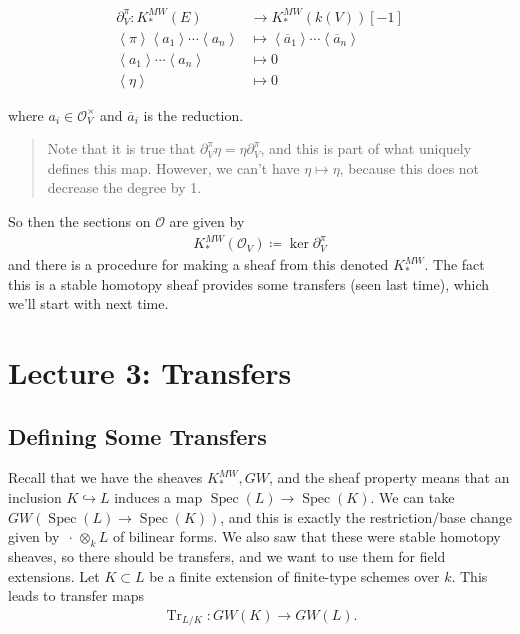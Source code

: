 \begin{align*} {\partial}_V^\pi: K_*^{MW}(E) &\to K_*^{MW}(k(V))[-1] \\ \left\langle{\pi}\right\rangle\left\langle{a_1}\right\rangle\cdots\left\langle{a_n}\right\rangle &\mapsto \left\langle{\overline a_1}\right\rangle \cdots\left\langle{\overline a_n}\right\rangle \\ \left\langle{a_1}\right\rangle \cdots \left\langle{a_n}\right\rangle &\mapsto 0 \\ \left\langle{\eta}\right\rangle &\mapsto 0 \end{align*}

where \(a_i \in \mathcal{O}_V^\times\) and \(\overline a_i\) is the
reduction.

\begin{quote}
Note that it is true that
\({\partial}_V^\pi \eta = \eta {\partial}_V^\pi\), and this is part of
what uniquely defines this map. However, we can't have
\(\eta \mapsto \eta\), because this does not decrease the degree by 1.
\end{quote}

So then the sections on \(\mathcal O\) are given by
\begin{align*}
K^{MW}_*(\mathcal O_V) \coloneqq\ker {\partial}_V^\pi
\end{align*}
and there is a procedure for making a sheaf from this denoted
\(K_*^{MW}\). The fact this is a stable homotopy sheaf provides some
transfers (seen last time), which we'll start with next time.

\hypertarget{lecture-3-transfers}{%
\section{Lecture 3: Transfers}\label{lecture-3-transfers}}

\hypertarget{defining-some-transfers}{%
\subsection{Defining Some Transfers}\label{defining-some-transfers}}

Recall that we have the sheaves \(K^{MW}_*, GW\), and the sheaf property
means that an inclusion \(K \hookrightarrow L\) induces a map
\(\operatorname{Spec}(L) \to \operatorname{Spec}(K)\). We can take
\(GW(\operatorname{Spec}(L) \to \operatorname{Spec}(K))\), and this is
exactly the restriction/base change given by \({\,\cdot\,}\otimes_k L\)
of bilinear forms. We also saw that these were stable homotopy sheaves,
so there should be transfers, and we want to use them for field
extensions. Let \(K\subset L\) be a finite extension of finite-type
schemes over \(k\). This leads to transfer maps
\begin{align*}
\operatorname{Tr}_{L/K}: GW(K) \to GW(L).
\end{align*}

